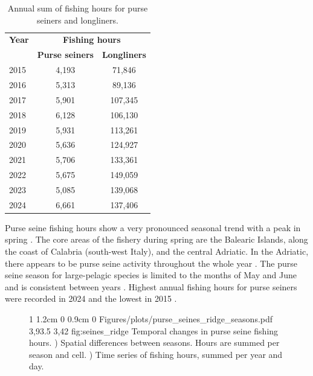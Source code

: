 \begin{table}[h]
\centering
\caption{Annual sum of fishing hours for purse seiners and longliners.}
\medskip
\begin{tabular}{lcc}
\toprule
\textbf{Year} & \multicolumn{2}{c}{\textbf{Fishing hours}} \\
\cmidrule(lr){2-3}
                 & \textbf{Purse seiners} & \textbf{Longliners} \\
\midrule
2015   & 4,193   & 71,846 \\
2016   & 5,313   & 89,136 \\
2017   & 5,901   & 107,345 \\
2018   & 6,128   & 106,130 \\
2019   & 5,931   & 113,261 \\
2020   & 5,636   & 124,927 \\
2021   & 5,706   & 133,361 \\
2022   & 5,675   & 149,059 \\
2023   & 5,085   & 139,068 \\
2024   & 6,661   & 137,406 \\
\bottomrule
\end{tabular}
\label{tab:year_hours}
\end{table}

Purse seine fishing hours show a very pronounced seasonal trend with a peak in spring . The core areas of the fishery
during spring are the Balearic Islands, along the coast of Calabria (south-west Italy), and the central Adriatic. In the Adriatic, there appears to be
purse seine activity throughout the whole year . The purse seine season for large-pelagic species is limited to the months
of May and June and is consistent between years . Highest annual fishing hours for purse seiners were recorded in 2024 and the
lowest in 2015 .

\begin{figure}
    {1\linewidth}
    {1.2cm 0 0.9cm 0}                       %
    {Figures/plots/purse_seines_ridge_seasons.pdf} %
    {3,93.5}                                  %
    {3,42}                                  %
    {fig:seines_ridge}
    {%
    Temporal changes in purse seine fishing hours. ) Spatial differences between seasons. 
    Hours are summed per season and cell. ) Time series of fishing hours, summed per year 
    and day.}
\end{figure}

